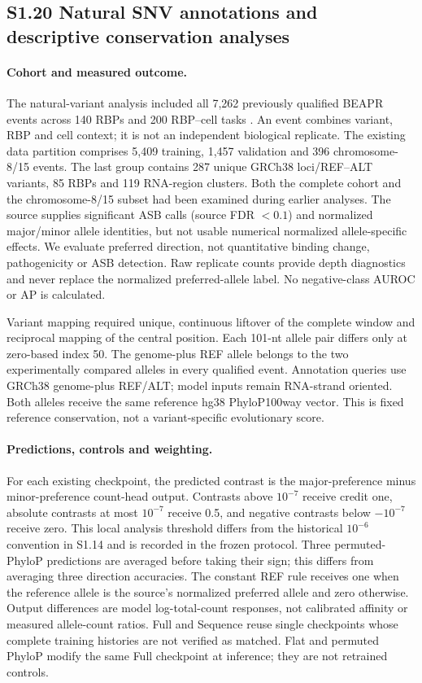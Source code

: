 \subsection*{S1.20 Natural SNV annotations and descriptive conservation analyses}

\paragraph{Cohort and measured outcome.} The natural-variant analysis included all 7,262 previously qualified BEAPR events across 140 RBPs and 200 RBP--cell tasks \citep{yang2019asb}. An event combines variant, RBP and cell context; it is not an independent biological replicate. The existing data partition comprises 5,409 training, 1,457 validation and 396 chromosome-8/15 events. The last group contains 287 unique GRCh38 loci/REF--ALT variants, 85 RBPs and 119 RNA-region clusters. Both the complete cohort and the chromosome-8/15 subset had been examined during earlier analyses. The source supplies significant ASB calls (source FDR $<0.1$) and normalized major/minor allele identities, but not usable numerical normalized allele-specific effects. We evaluate preferred direction, not quantitative binding change, pathogenicity or ASB detection. Raw replicate counts provide depth diagnostics and never replace the normalized preferred-allele label. No negative-class AUROC or AP is calculated.

Variant mapping required unique, continuous liftover of the complete window and reciprocal mapping of the central position. Each 101-nt allele pair differs only at zero-based index 50. The genome-plus REF allele belongs to the two experimentally compared alleles in every qualified event. Annotation queries use GRCh38 genome-plus REF/ALT; model inputs remain RNA-strand oriented. Both alleles receive the same reference hg38 PhyloP100way vector. This is fixed reference conservation, not a variant-specific evolutionary score.

\paragraph{Predictions, controls and weighting.} For each existing checkpoint, the predicted contrast is the major-preference minus minor-preference count-head output. Contrasts above $10^{-7}$ receive credit one, absolute contrasts at most $10^{-7}$ receive 0.5, and negative contrasts below $-10^{-7}$ receive zero. This local analysis threshold differs from the historical $10^{-6}$ convention in S1.14 and is recorded in the frozen protocol. Three permuted-PhyloP predictions are averaged before taking their sign; this differs from averaging three direction accuracies. The constant REF rule receives one when the reference allele is the source's normalized preferred allele and zero otherwise. Output differences are model log-total-count responses, not calibrated affinity or measured allele-count ratios. Full and Sequence reuse single checkpoints whose complete training histories are not verified as matched. Flat and permuted PhyloP modify the same Full checkpoint at inference; they are not retrained controls.

